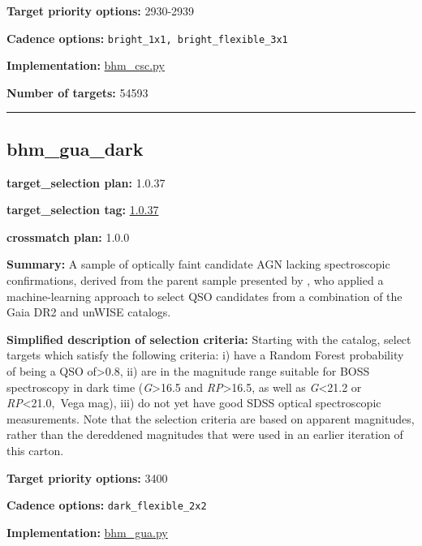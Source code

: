 \noindent\textbf{Target priority options:} 2930-2939

\noindent\textbf{Cadence options:} \texttt{bright\_1x1,\ bright\_flexible\_3x1}

\noindent\textbf{Implementation:}
\href{https://github.com/sdss/target_selection/blob/1.0.37/python/target_selection/cartons/bhm_csc.py}{bhm\_csc.py}

\noindent\textbf{Number of targets:} 54593

\begin{center}\rule{0.5\linewidth}{0.5pt}\end{center}

\hypertarget{bhm_gua_dark_plan1.0.37}{%
\subsection{bhm\_gua\_dark}\label{bhm_gua_dark_plan1.0.37}}

\noindent\textbf{target\_selection plan:} 1.0.37

\noindent\textbf{target\_selection tag:}
\href{https://github.com/sdss/target_selection/tree/1.0.37/}{1.0.37}

\noindent\textbf{crossmatch plan:} 1.0.0

\noindent\textbf{Summary:} A sample of optically faint candidate AGN lacking
spectroscopic confirmations, derived from the parent sample presented by
\citet{Shu2019}, who applied a machine-learning approach to select QSO
candidates from a combination of the Gaia DR2 and unWISE catalogs.

\noindent\textbf{Simplified description of selection criteria:} Starting with the
\citet{Shu2019} catalog, select targets which satisfy the following
criteria: i) have a Random Forest probability of being a QSO
of\textgreater0.8, ii) are in the magnitude range suitable for BOSS
spectroscopy in dark time (\emph{G}\textgreater16.5 and
\emph{RP}\textgreater16.5, as well as \emph{G}\textless21.2 or
\emph{RP}\textless21.0,~Vega mag), iii) do not yet have good SDSS
optical spectroscopic measurements. Note that the selection criteria are
based on apparent magnitudes, rather than the dereddened magnitudes that
were used in an earlier iteration of this carton.


\noindent\textbf{Target priority options:} 3400

\noindent\textbf{Cadence options:} \texttt{dark\_flexible\_2x2}

\noindent\textbf{Implementation:}
\href{https://github.com/sdss/target_selection/blob/1.0.37/python/target_selection/cartons/bhm_gua.py}{bhm\_gua.py}

